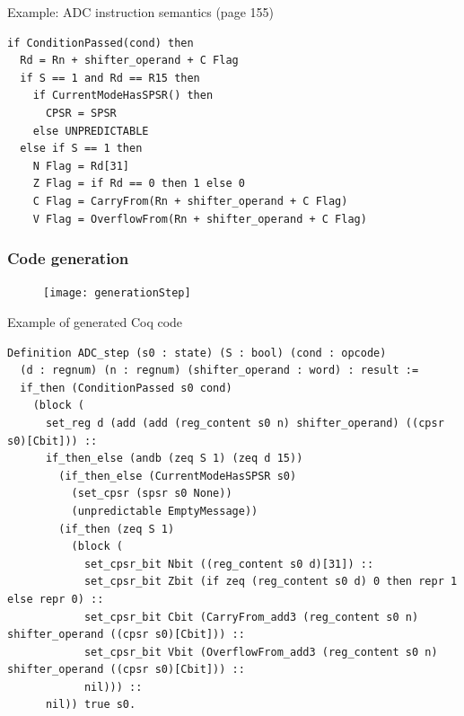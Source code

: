 \documentclass{beamer}
\newenvironment{f}[1]{\begin{frame}\frametitle{#1}}{\end{frame}}
\begin{document}

\begin{frame}[fragile]{Example: ADC instruction semantics (page 155)}

\begin{verbatim}
if ConditionPassed(cond) then
  Rd = Rn + shifter_operand + C Flag
  if S == 1 and Rd == R15 then
    if CurrentModeHasSPSR() then
      CPSR = SPSR
    else UNPREDICTABLE
  else if S == 1 then
    N Flag = Rd[31]
    Z Flag = if Rd == 0 then 1 else 0
    C Flag = CarryFrom(Rn + shifter_operand + C Flag)
    V Flag = OverflowFrom(Rn + shifter_operand + C Flag)
\end{verbatim}

\end{frame}


\begin{f}{Code generation}

\begin{figure}
\texttt{[image: generationStep]}
\end{figure}

\end{f}


\begin{frame}[fragile]{Example of generated Coq code}

{\small\begin{verbatim}
Definition ADC_step (s0 : state) (S : bool) (cond : opcode)
  (d : regnum) (n : regnum) (shifter_operand : word) : result :=
  if_then (ConditionPassed s0 cond)
    (block (
      set_reg d (add (add (reg_content s0 n) shifter_operand) ((cpsr s0)[Cbit])) ::
      if_then_else (andb (zeq S 1) (zeq d 15))
        (if_then_else (CurrentModeHasSPSR s0)
          (set_cpsr (spsr s0 None))
          (unpredictable EmptyMessage))
        (if_then (zeq S 1)
          (block (
            set_cpsr_bit Nbit ((reg_content s0 d)[31]) ::
            set_cpsr_bit Zbit (if zeq (reg_content s0 d) 0 then repr 1 else repr 0) ::
            set_cpsr_bit Cbit (CarryFrom_add3 (reg_content s0 n) shifter_operand ((cpsr s0)[Cbit])) ::
            set_cpsr_bit Vbit (OverflowFrom_add3 (reg_content s0 n) shifter_operand ((cpsr s0)[Cbit])) ::
            nil))) ::
      nil)) true s0.
\end{verbatim}}

\end{frame}
\end{document}
